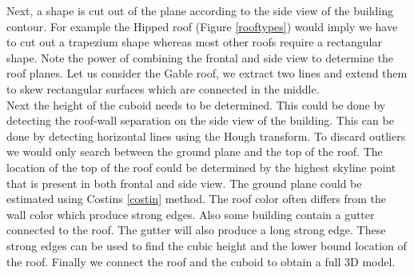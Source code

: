 Next, a shape is cut out of the plane according to the side view of the building contour.
For example the Hipped roof (Figure \ref{rooftypes}) would imply we have to cut
out a trapezium shape whereas most other roofs require a rectangular shape.
Note the power of combining the frontal and side view to determine the roof planes.
Let us consider the Gable roof, we extract two lines and extend them to skew
rectangular surfaces which are connected in the middle.\\

Next the height of the cuboid needs to be determined.
This could be done by detecting the roof-wall separation on the side view of the
building.  This can be done by detecting horizontal lines using the Hough
transform.
To discard outliers we would only search between the ground plane and the top of
the roof.  The location of the top of the roof could be determined by the highest skyline point that
is present in both frontal and side view. The ground plane could be estimated
using Costins \ref{costin} method.
The roof color often differs from the wall color which produce strong edges. Also
some building contain a gutter connected to the roof. The gutter will also
produce a long strong edge.  These strong edges can be used to find the cubic height
and the lower bound location of the roof.
Finally we connect the roof and the cuboid to obtain a full 3D model.
\\


